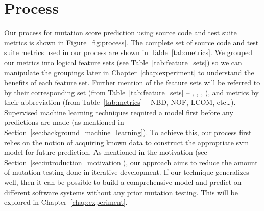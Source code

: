 \section{Process}
\label{sec:approach_process}
Our process for mutation score prediction using source code and test suite metrics is shown in Figure~\ref{fig:process}. The complete set of source code and test suite metrics used in our process are shown in Table~\ref{tab:metrics}. We grouped our metrics into logical feature sets (see Table~\ref{tab:feature_sets}) so we can manipulate the groupings later in Chapter~\ref{chap:experiment} to understand the benefits of each feature set. Further mention of the feature sets will be referred to by their corresponding set (from Table~\ref{tab:feature_sets} -- , , , ), and metrics by their abbreviation (from Table~\ref{tab:metrics} -- NBD, NOF, LCOM, etc\ldots). Supervised machine learning techniques required a model first before any predictions are made (as mentioned in Section~\ref{sec:background_machine_learning}). To achieve this, our process first relies on the notion of acquiring known data to construct the appropriate \gls{svm} model for future prediction. As mentioned in the motivation (see Section~\ref{sec:introduction_motivation}), our approach aims to reduce the amount of mutation testing done in iterative development. If our technique generalizes well, then it can be possible to build a comprehensive model and predict on different software systems without any prior mutation testing. This will be explored in Chapter~\ref{chap:experiment}.

